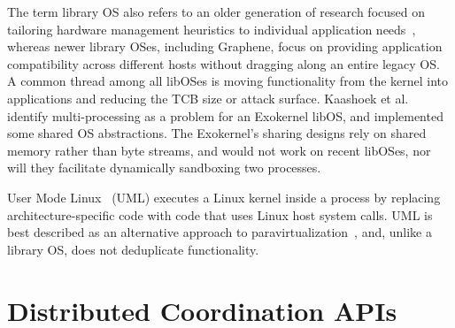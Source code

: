 The term library OS also refers to an older generation of research
focused on tailoring hardware management heuristics 
to individual application needs~\citep{kaashoek97exokernel,anderson92libos,cheriton94cache,leslie96nemesis,libra},
whereas newer library OSes, including Graphene, focus
on providing application compatibility
across different hosts without dragging along an entire legacy OS.
A common thread among all libOSes is moving functionality from the kernel
into applications and reducing the TCB size or attack surface.
Kaashoek et al.~\citep{kaashoek97exokernel} identify multi-processing as a problem for an Exokernel libOS,
and implemented some shared OS abstractions.
The Exokernel's sharing designs rely on shared memory rather than byte streams,
and would not work on recent libOSes,
nor will they facilitate dynamically sandboxing two processes.


\begin{comment}
Dune~\citep{belay12dune} %
leverages virtualization hardware 
to allow an application
to safely manage privileged CPU features
such as page tables and interrupts.
Dune's goals are complimentary to ours; we expect that
certain aspects of the PAL implementation would be simplified on Dune.
\end{comment}

User Mode Linux~\citep{user-mode-linux} (UML) executes a Linux kernel inside a process
by replacing  architecture-specific code with 
code 
that uses Linux host system calls. %
UML is best described as  an alternative approach to paravirtualization~\citep{barham03xen},
and, unlike a library OS, does not deduplicate functionality.

\section{Distributed Coordination APIs}

